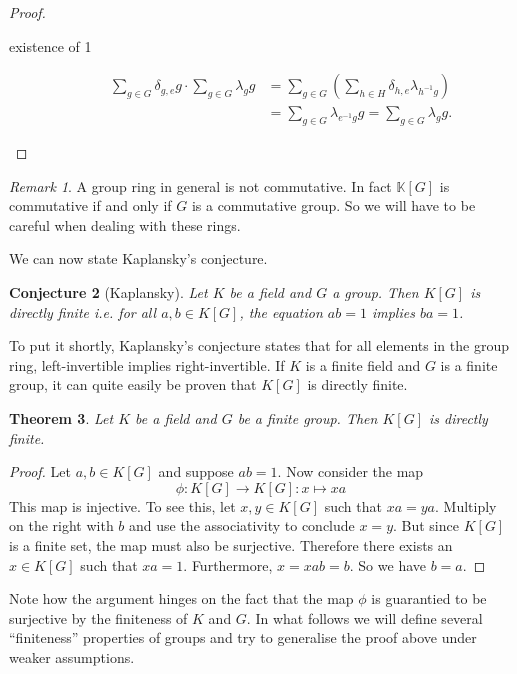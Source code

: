 \documentclass[titlepage, a4paper]{article}
\newtheorem{theorem}{Theorem}[section]
\newtheorem{conjecture}[theorem]{Conjecture}
\theoremstyle{remark}
\newtheorem{remark}[theorem]{Remark}
\begin{document}
\begin{proof}
\begin{description}
    \item[existence of 1]
    \begin{align*}
    \sum_{g \in G} \delta_{g,e} g \cdot \sum_{g \in G} \lambda_g g
    &= \sum_{g \in G} \left(\sum_{h \in H} \delta_{h,e} \lambda_{h^{-1}g} \right) \\
    &= \sum_{g \in G} \lambda_{e^{-1}g} g = \sum_{g \in G} \lambda_g g.
    \end{align*}
    
    \end{description}
\end{proof}

\begin{remark}
	A group ring in general is not commutative. In fact $\mathbb{K}[G]$ is commutative if and only if $G$ is a commutative group. So we will have to be careful when dealing with these rings. 
\end{remark}
We can now state Kaplansky's conjecture.

\begin{conjecture}[Kaplansky]
    Let $K$ be a field and $G$ a group. Then $K[G]$ is directly finite i.e. for all $a, b \in K[G]$, the equation $ab=1$ implies $ba=1$.
\end{conjecture}

To put it shortly, Kaplansky's conjecture states that for all elements in the group ring, left-invertible implies right-invertible. If $K$ is a finite field and $G$ is a finite group, it can quite easily be proven that $K[G]$ is directly finite.

\begin{theorem}
    Let $K$ be a field and $G$ be a finite group. Then $K[G]$ is directly finite.
\end{theorem}
\begin{proof}
    Let $a, b \in K[G]$ and suppose $ab=1$. Now consider the map
    \[
        \phi: K[G] \to K[G]: x \mapsto x a
    \]
    This map is injective. To see this, let $x, y \in K[G]$ such that $xa=ya$. Multiply on the right with $b$ and use the associativity to conclude $x=y$.
    But since $K[G]$ is a finite set, the map must also be surjective. Therefore there exists an $x \in K[G]$ such that $x a = 1$. Furthermore, $x = xab = b$. So we have $b=a$.
\end{proof}

Note how the argument hinges on the fact that the map $\phi$ is guarantied to be surjective by the finiteness of $K$ and $G$. In what follows we will define several ``finiteness'' properties of groups and try to generalise the proof above under weaker assumptions.
\end{document}
